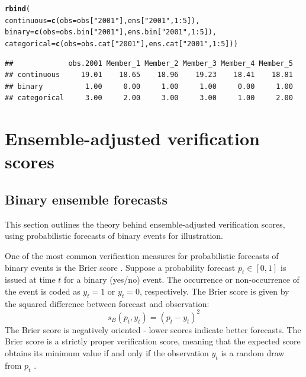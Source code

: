 \documentclass[article]{jss}\usepackage{graphicx, color}
\makeatletter
\newcommand{\hlfunctioncall}[1]{\textcolor[rgb]{0,0.501960784313725,0.752941176470588}{\textbf{#1}}}%
\newcommand{\hlstring}[1]{\textcolor[rgb]{0.650980392156863,0.52156862745098,0}{#1}}%
\newenvironment{kframe}{%
 \def\at@end@of@kframe{}%
 \ifinner\ifhmode%
  \def\at@end@of@kframe{\end{minipage}}%
  \begin{minipage}{\columnwidth}%
 \fi\fi%
 \def\FrameCommand##1{\hskip\@totalleftmargin \hskip-\fboxsep
 \colorbox{shadecolor}{##1}\hskip-\fboxsep
     \hskip-\linewidth \hskip-\@totalleftmargin \hskip\columnwidth}%
 \MakeFramed {\advance\hsize-\width
   \@totalleftmargin\z@ \linewidth\hsize
   \@setminipage}}%
 {\par\unskip\endMakeFramed%
 \at@end@of@kframe}
\newenvironment{knitrout}{}{} %
\makeatother
\begin{document}
\begin{knitrout}
\color{fgcolor}\begin{kframe}
\begin{alltt}
\hlfunctioncall{rbind}(
continuous = \hlfunctioncall{c}(obs=obs[\hlstring{"2001"}], ens[\hlstring{"2001"}, 1:5]),
binary     = \hlfunctioncall{c}(obs=obs.bin[\hlstring{"2001"}], ens.bin[\hlstring{"2001"}, 1:5]),
categorical = \hlfunctioncall{c}(obs=obs.cat[\hlstring{"2001"}], ens.cat[\hlstring{"2001"}, 1:5]))
\end{alltt}
\begin{verbatim}
##             obs.2001 Member_1 Member_2 Member_3 Member_4 Member_5
## continuous     19.01    18.65    18.96    19.23    18.41    18.81
## binary          1.00     0.00     1.00     1.00     0.00     1.00
## categorical     3.00     2.00     3.00     3.00     1.00     2.00
\end{verbatim}
\end{kframe}
\end{knitrout}




\section{Ensemble-adjusted verification scores}



\subsection{Binary ensemble forecasts}

This section outlines the theory behind ensemble-adjusted verification scores, using probabilistic forecasts of binary events for illustration.  

One of the most common verification measures for probabilistic forecasts of binary events is the Brier score \citep{brier1950verification}.
Suppose a probability forecast $p_t \in [0,1]$ is issued at time $t$ for a binary (yes/no) event.
The occurrence or non-occurrence of the event is coded as $y_t=1$ or $y_t=0$, respectively. 
The Brier score is given by the squared difference between forecast and observation:
%
\begin{equation}
s_{B}(p_t, y_t) = (p_t - y_t)^2
\end{equation}
%
The Brier score is negatively oriented - lower scores indicate better forecasts.
The Brier score is a strictly proper verification score, meaning that the expected score obtains its minimum value if and only if the observation $y_t$ is a random draw from $p_t$ \citep{gneiting2007strictly}.
\end{document}

